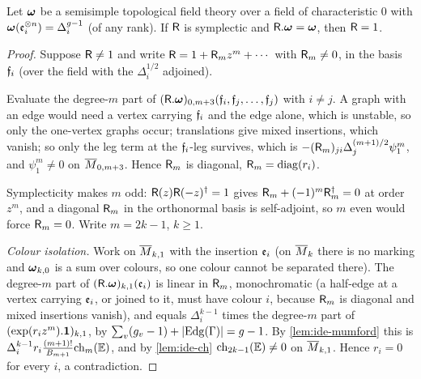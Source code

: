 \begin{lem}
\label{lem:ide-free}
Let $\boldsymbol{\omega}$ be a semisimple topological field theory over a field of characteristic $0$ with $\boldsymbol{\omega}(\mathfrak{e}_i^{\otimes n})=\Delta_i^{g-1}$ (of any rank). If $\mathsf{R}$ is symplectic and $\mathsf{R}.\boldsymbol{\omega}=\boldsymbol{\omega}$, then $\mathsf{R}=1$.
\end{lem}
\begin{proof}
Suppose $\mathsf{R}\neq 1$ and write $\mathsf{R}=1+\mathsf{R}_mz^m+\cdots$ with $\mathsf{R}_m\neq 0$, in the basis $\mathfrak{f}_i$ (over the field with the $\Delta_i^{1/2}$ adjoined).

Evaluate the degree-$m$ part of $(\mathsf{R}.\boldsymbol{\omega})_{0,m+3}(\mathfrak{f}_i,\mathfrak{f}_j,\dots,\mathfrak{f}_j)$ with $i\neq j$. A graph with an edge would need a vertex carrying $\mathfrak{f}_i$ and the edge alone, which is unstable, so only the one-vertex graphs occur; translations give mixed insertions, which vanish; so only the leg term at the $\mathfrak{f}_i$-leg survives, which is $-(\mathsf{R}_m)_{ji}\Delta_j^{(m+1)/2}\psi_1^m$, and $\psi_1^m\neq 0$ on $\overline{M}_{0,m+3}$. Hence $\mathsf{R}_m$ is diagonal, $\mathsf{R}_m=\mathrm{diag}(r_i)$.

Symplecticity makes $m$ odd: $\mathsf{R}(z)\mathsf{R}(-z)^\dagger=1$ gives $\mathsf{R}_m+(-1)^m\mathsf{R}_m^\dagger=0$ at order $z^m$, and a diagonal $\mathsf{R}_m$ in the orthonormal basis is self-adjoint, so $m$ even would force $\mathsf{R}_m=0$. Write $m=2k-1$, $k\geq 1$.

\emph{Colour isolation.} Work on $\overline{M}_{k,1}$ with the insertion $\mathfrak{e}_i$ (on $\overline{M}_k$ there is no marking and $\boldsymbol{\omega}_{k,0}$ is a sum over colours, so one colour cannot be separated there). The degree-$m$ part of $(\mathsf{R}.\boldsymbol{\omega})_{k,1}(\mathfrak{e}_i)$ is linear in $\mathsf{R}_m$, monochromatic (a half-edge at a vertex carrying $\mathfrak{e}_i$, or joined to it, must have colour $i$, because $\mathsf{R}_m$ is diagonal and mixed insertions vanish), and equals $\Delta_i^{k-1}$ times the degree-$m$ part of $(\exp(r_iz^m).\mathbf{1})_{k,1}$, by $\sum_v(g_v-1)+|\mathrm{Edg}(\Gamma)|=g-1$. By \cref{lem:ide-mumford} this is $\Delta_i^{k-1}r_i\frac{(m+1)!}{B_{m+1}}\mathrm{ch}_m(\mathbb{E})$, and by \cref{lem:ide-ch} $\mathrm{ch}_{2k-1}(\mathbb{E})\neq 0$ on $\overline{M}_{k,1}$. Hence $r_i=0$ for every $i$, a contradiction.
\end{proof}

